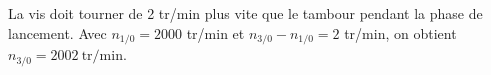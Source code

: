 \begin{corrigebox}
La vis doit tourner de 2 tr/min plus vite que le tambour pendant
            la phase de lancement. Avec $n_{1/0}=2000$ tr/min et
            $n_{3/0}-n_{1/0}=2$ tr/min, on obtient
            $\boxed{n_{3/0}=2002\ \text{tr/min}}$.
\end{corrigebox}
